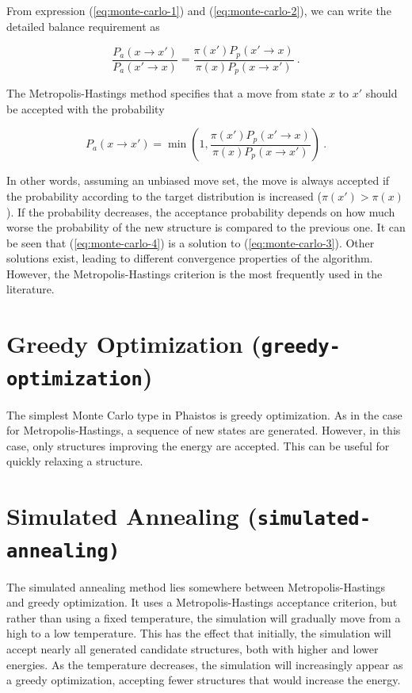 \documentclass[11pt,a4paper,twoside]{book}
\begin{document}
From expression (\ref{eq:monte-carlo-1}) and (\ref{eq:monte-carlo-2}), we can
write the detailed balance requirement as

\begin{equation}
\frac{P_a(x \rightarrow x')}{P_a(x' \rightarrow x)} = \frac{\pi(x')P_p(x' \rightarrow x)}{\pi(x)P_p(x \rightarrow x')} \ .
\label{eq:monte-carlo-3}
\end{equation}

\noindent
The Metropolis-Hastings method \cite{metropolis1953equation} specifies
that a move from state $x$ to $x'$ should be accepted with the
probability

\begin{equation}
P_a(x \rightarrow x') = \min\left(1, \frac{\pi(x')P_p(x' \rightarrow x)}{\pi(x)P_p(x \rightarrow x')}\right) \ .
\label{eq:monte-carlo-4}
\end{equation}

\noindent
In other words, assuming an unbiased move set, the move is always
accepted if the probability according to the target distribution is
increased ($\pi(x')>\pi(x)$). If the probability decreases, the acceptance
probability depends on how much worse the probability of the new
structure is compared to the previous one. It can be seen that
(\ref{eq:monte-carlo-4}) is a solution to
(\ref{eq:monte-carlo-3}). Other solutions exist, leading to different
convergence properties of the algorithm.  However, the
Metropolis-Hastings criterion is the most frequently used in the
literature.

\section{Greedy Optimization (\texttt{greedy-optimization})}
\label{sec:greedy-optimization}

The simplest Monte Carlo type in Phaistos is greedy optimization. As
in the case for Metropolis-Hastings, a sequence of new states are
generated. However, in this case, only structures improving the energy
are accepted. This can be useful for quickly relaxing a structure.

\section{Simulated Annealing (\texttt{simulated-annealing)}}
\label{sec:simulated-annealing}

The simulated annealing method \cite{kirkpatrick1983optimization} lies
somewhere between Metropolis-Hastings and greedy optimization. It uses
a Metropolis-Hastings acceptance criterion, but rather than using a
fixed temperature, the simulation will gradually move from a high to a
low temperature. This has the effect that initially, the simulation
will accept nearly all generated candidate structures, both with
higher and lower energies. As the temperature decreases, the
simulation will increasingly appear as a greedy optimization,
accepting fewer structures that would increase the energy.
\end{document}
